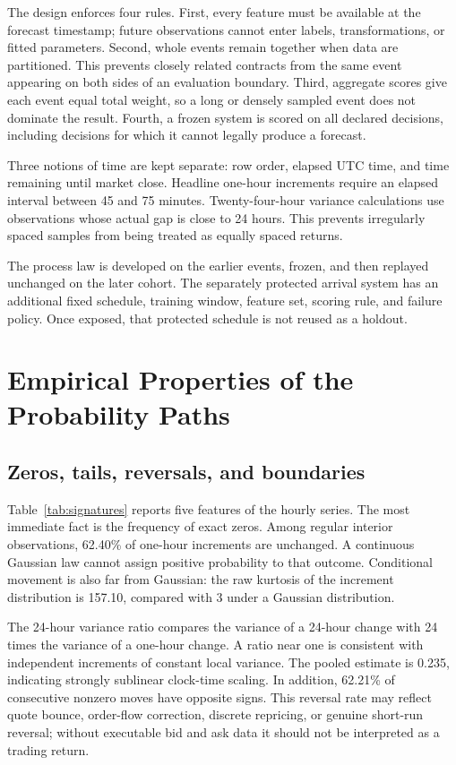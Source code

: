 \documentclass[11pt]{article}
\begin{document}
The design enforces four rules. First, every feature must be available at the forecast timestamp;
future observations cannot enter labels, transformations, or fitted parameters. Second, whole
events remain together when data are partitioned. This prevents closely related contracts from
the same event appearing on both sides of an evaluation boundary. Third, aggregate scores give
each event equal total weight, so a long or densely sampled event does not dominate the result.
Fourth, a frozen system is scored on all declared decisions, including decisions for which it
cannot legally produce a forecast.

Three notions of time are kept separate: row order, elapsed UTC time, and time remaining until
market close. Headline one-hour increments require an elapsed interval between 45 and 75 minutes.
Twenty-four-hour variance calculations use observations whose actual gap is close to 24 hours.
This prevents irregularly spaced samples from being treated as equally spaced returns.

The process law is developed on the earlier events, frozen, and then replayed unchanged on the
later cohort. The separately protected arrival system has an additional fixed schedule, training
window, feature set, scoring rule, and failure policy. Once exposed, that protected schedule is
not reused as a holdout.

\section{Empirical Properties of the Probability Paths}

\subsection{Zeros, tails, reversals, and boundaries}

Table~\ref{tab:signatures} reports five features of the hourly series. The most immediate fact is
the frequency of exact zeros. Among regular interior observations, 62.40\% of one-hour increments
are unchanged. A continuous Gaussian law cannot assign positive probability to that outcome.
Conditional movement is also far from Gaussian: the raw kurtosis of the increment distribution
is 157.10, compared with 3 under a Gaussian distribution.

The 24-hour variance ratio compares the variance of a 24-hour change with 24 times the variance of
a one-hour change. A ratio near one is consistent with independent increments of constant local
variance. The pooled estimate is 0.235, indicating strongly sublinear clock-time scaling. In
addition, 62.21\% of consecutive nonzero moves have opposite signs. This reversal rate may reflect
quote bounce, order-flow correction, discrete repricing, or genuine short-run reversal; without
executable bid and ask data it should not be interpreted as a trading return.
\end{document}

